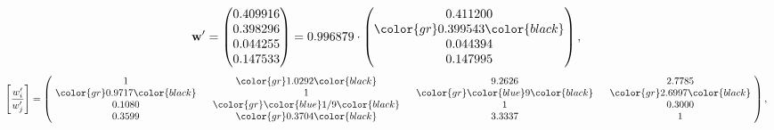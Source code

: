 \begin{example}
\begin{equation*}
\mathbf{w}^{\prime} =
\begin{pmatrix}
0.409916\\
0.398296\\
0.044255\\
0.147533
\end{pmatrix} =
0.996879\cdot
\begin{pmatrix}
0.411200\\
\color{gr} 0.399543\color{black} \\
0.044394\\
0.147995
\end{pmatrix},
\end{equation*}
\begin{equation*}
\left[ \frac{{w}^{\prime}_i}{{w}^{\prime}_j} \right] =
\begin{pmatrix}
$\,\,$ 1 $\,\,$ & $\,\,$\color{gr} 1.0292\color{black} $\,\,$ & $\,\,$9.2626$\,\,$ & $\,\,$2.7785$\,\,$ \\
$\,\,$\color{gr} 0.9717\color{black} $\,\,$ & $\,\,$ 1 $\,\,$ & $\,\,$\color{gr} \color{blue} 9\color{black} $\,\,$ & $\,\,$\color{gr} 2.6997\color{black}   $\,\,$ \\
$\,\,$0.1080$\,\,$ & $\,\,$\color{gr} \color{blue}  1/9\color{black} $\,\,$ & $\,\,$ 1 $\,\,$ & $\,\,$0.3000 $\,\,$ \\
$\,\,$0.3599$\,\,$ & $\,\,$\color{gr} 0.3704\color{black} $\,\,$ & $\,\,$3.3337$\,\,$ & $\,\,$ 1  $\,\,$ \\
\end{pmatrix},
\end{equation*}
\end{example}
\newpage
